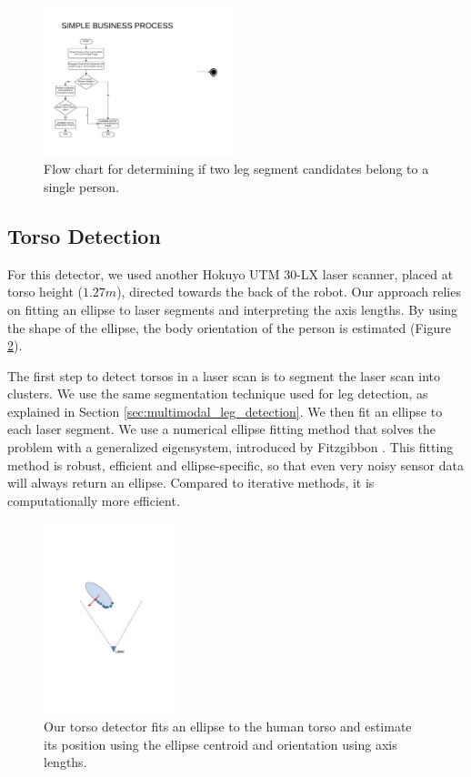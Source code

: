 \begin{figure}[ht!]
\centering
\includegraphics[width=0.5\textwidth]{pics/leg_connectivity_diagram}
\caption{Flow chart for determining if two leg segment candidates belong to a single person.}
\label{fig:leg_connectivity_diagram}
\end{figure}


\subsection{Torso Detection}
\label{sec:multimodal_torso_detection}

For this detector, we used another Hokuyo UTM 30-LX laser scanner, placed at torso height ($1.27m$), directed towards the back of the robot. Our approach relies on fitting an ellipse to laser segments and interpreting the axis lengths. By using the shape of the ellipse, the body orientation of the person is estimated (Figure \ref{fig:ellipse}). 

The first step to detect torsos in a laser scan is to segment the laser scan into clusters. We use the same segmentation technique used for leg detection, as explained in Section \ref{sec:multimodal_leg_detection}. We then fit an ellipse to each laser segment. We use a numerical ellipse fitting method that solves the problem with a generalized eigensystem, introduced by Fitzgibbon \cite{fitzgibbon1999direct}. This fitting method is robust, efficient and ellipse-specific, so that even very noisy sensor data will always return an ellipse. Compared to iterative methods, it is computationally more efficient.

\begin{figure}[ht!]
\centering
\includegraphics[width=0.35\textwidth]{pics/ellipse}
\caption{Our torso detector fits an ellipse to the human torso and estimate its position using the ellipse centroid and orientation using axis lengths.}
\label{fig:ellipse}
\end{figure}

